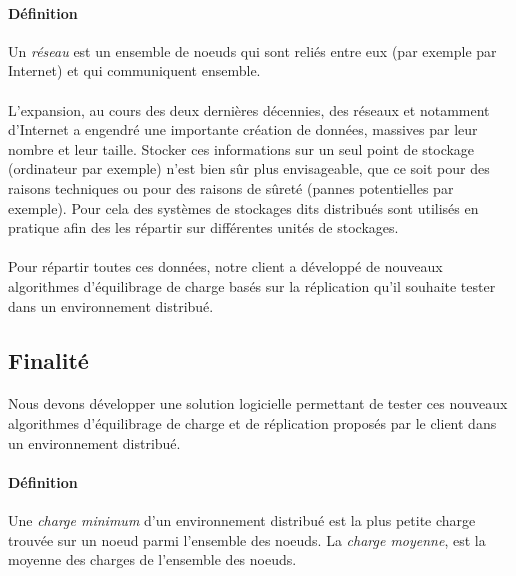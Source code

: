 \documentclass[12pt]{article}
\begin{document}
\paragraph{Définition} Un \textit{réseau} est un ensemble de noeuds qui sont reliés entre eux (par exemple par Internet) et qui communiquent ensemble.

\paragraph{} L'expansion, au cours des deux dernières décennies, des réseaux et notamment d'Internet a engendré une importante création de données, massives par leur nombre et leur taille.
Stocker ces informations sur un seul point de stockage (ordinateur par exemple) n'est bien sûr plus envisageable, que ce soit pour des raisons techniques ou pour des raisons de sûreté (pannes potentielles par exemple).
Pour cela des systèmes de stockages dits distribués sont utilisés en pratique afin des les répartir sur différentes unités de stockages.

\paragraph{} Pour répartir toutes ces données, notre client a développé de nouveaux algorithmes d'équilibrage de charge basés sur la réplication qu'il souhaite tester dans un environnement distribué.


\subsection{Finalité}

\paragraph{} Nous devons développer une solution logicielle permettant de tester ces nouveaux algorithmes d'équilibrage de charge et de réplication proposés par le client dans un environnement distribué.

\paragraph{Définition} Une \textit{charge minimum} d'un environnement distribué est la plus petite charge trouvée sur un noeud parmi l'ensemble des noeuds. La \textit{charge moyenne}, est la moyenne des charges de l'ensemble des noeuds.
\end{document}
